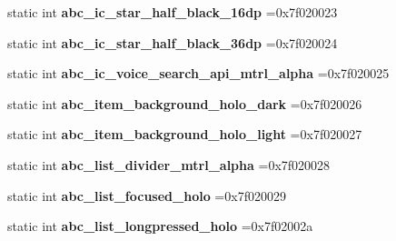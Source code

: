\begin{DoxyCompactItemize}
static int {\bfseries abc\+\_\+ic\+\_\+star\+\_\+half\+\_\+black\+\_\+16dp} =0x7f020023
\item 
\mbox{\label{classandroid_1_1support_1_1v7_1_1mediarouter_1_1R_1_1drawable_a7b0381d89858e27b42f039f2c94fe479}} 
static int {\bfseries abc\+\_\+ic\+\_\+star\+\_\+half\+\_\+black\+\_\+36dp} =0x7f020024
\item 
\mbox{\label{classandroid_1_1support_1_1v7_1_1mediarouter_1_1R_1_1drawable_a66ff6468fbe56a8e7267e447dcdc63cc}} 
static int {\bfseries abc\+\_\+ic\+\_\+voice\+\_\+search\+\_\+api\+\_\+mtrl\+\_\+alpha} =0x7f020025
\item 
\mbox{\label{classandroid_1_1support_1_1v7_1_1mediarouter_1_1R_1_1drawable_a88daa4180e98aec11a8c89366cef88fb}} 
static int {\bfseries abc\+\_\+item\+\_\+background\+\_\+holo\+\_\+dark} =0x7f020026
\item 
\mbox{\label{classandroid_1_1support_1_1v7_1_1mediarouter_1_1R_1_1drawable_a85d6b938f21f7854048039af2bbfd428}} 
static int {\bfseries abc\+\_\+item\+\_\+background\+\_\+holo\+\_\+light} =0x7f020027
\item 
\mbox{\label{classandroid_1_1support_1_1v7_1_1mediarouter_1_1R_1_1drawable_a327b2b9644ee05d4098818c3f2abe4ea}} 
static int {\bfseries abc\+\_\+list\+\_\+divider\+\_\+mtrl\+\_\+alpha} =0x7f020028
\item 
\mbox{\label{classandroid_1_1support_1_1v7_1_1mediarouter_1_1R_1_1drawable_a10d50dd75ae14f90ba953849d5005253}} 
static int {\bfseries abc\+\_\+list\+\_\+focused\+\_\+holo} =0x7f020029
\item 
\mbox{\label{classandroid_1_1support_1_1v7_1_1mediarouter_1_1R_1_1drawable_a10b49bc57dcfcf6638974a75287ef2dd}} 
static int {\bfseries abc\+\_\+list\+\_\+longpressed\+\_\+holo} =0x7f02002a
\item 

\end{DoxyCompactItemize}
